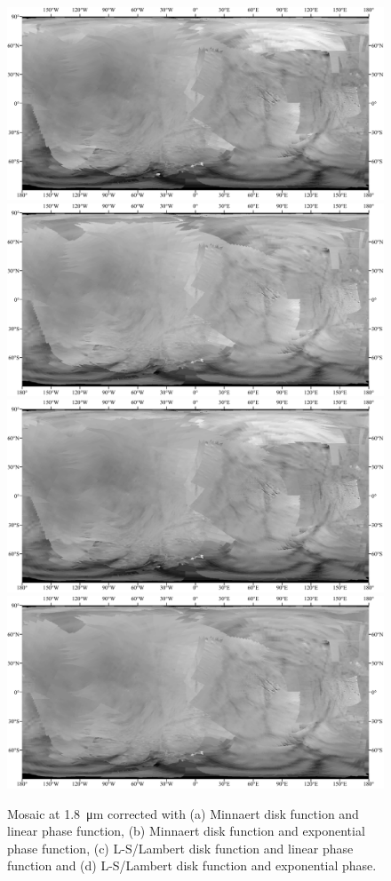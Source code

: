\documentclass{arxiv-icarus}
\begin{document}
\begin{landscape}
    \begin{figure}[!ht]
        \vspace{1.75cm}
        {\includegraphics[height=.25\linewidth]{Fig_S2a}}
        {\includegraphics[height=.25\linewidth]{Fig_S2b}}\\
        \vspace{1cm}
        {\includegraphics[height=.25\linewidth]{Fig_S2c}}
        {\includegraphics[height=.25\linewidth]{Fig_S2d}}\\
        \vspace{.5cm}
        \caption{Mosaic at \SI{1.8}{\um} corrected with (a) Minnaert disk function and linear phase function, (b) Minnaert disk function and exponential phase function, (c) L-S/Lambert disk function and linear phase function and (d) L-S/Lambert disk function and exponential phase.}
        \label{fig:fig_S2}
    \end{figure}
\end{landscape}
\end{document}
